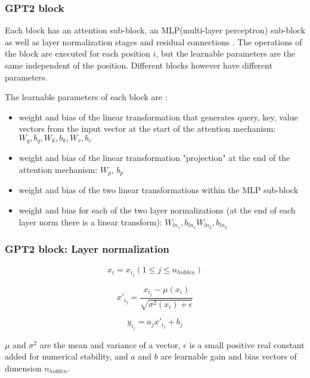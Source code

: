 \subsubsection{GPT2 block}


Each block has an attention sub-block, an MLP(multi-layer perceptron) sub-block as well as layer normalization stages and residual connections  .
The operations of the block are executed for each position $i$, but the learnable parameters are the same independent of the position. Different blocks however have different parameters.

The learnable parameters of each block are \cite{alammar-gpt2}:

\begin{itemize}
\item weight and bias of the linear transformation that generates query, key, value vectors from the input vector
   at the start of the attention mechanism: $W_q, b_q, W_k, b_k, W_v, b_v$
 \item weight and bias of the linear transformation "projection" at the end of the attention mechanism: $W_p$, $b_p$
 \item weight and bias of the two linear transformations within the MLP sub-block
 \item weight and bias for each of the two layer normalizations (at the end of each layer norm there is a linear transform): $W_{ln_1}, b_{ln_1} W_{ln_2}, b_{ln_2}$
\end{itemize}

\subsubsection{GPT2 block: Layer normalization}


$$x_i = x_{i_j} (1 \leq j \leq n_{hidden})$$

$$x'_{i_j} = \frac {x_{i_j} - \mu(x_i)} {\sqrt {\sigma^2(x_i)+\epsilon}} $$

$$y_{i_j} = a_j x'_{i_j} + b_j$$

$\mu$ and $\sigma^2$ are the mean and variance of a vector, $\epsilon$ is a small positive real constant added for numerical stability, and $a$ and $b$ are learnable gain and bias vectors of dimension $n_{hidden}$.

